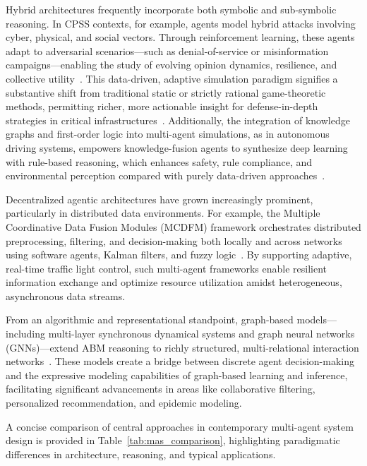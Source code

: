 \documentclass[sigconf]{acmart}
\begin{document}
Hybrid architectures frequently incorporate both symbolic and sub-symbolic reasoning. In CPSS contexts, for example, agents model hybrid attacks involving cyber, physical, and social vectors. Through reinforcement learning, these agents adapt to adversarial scenarios—such as denial-of-service or misinformation campaigns—enabling the study of evolving opinion dynamics, resilience, and collective utility~\cite{ref104}. This data-driven, adaptive simulation paradigm signifies a substantive shift from traditional static or strictly rational game-theoretic methods, permitting richer, more actionable insight for defense-in-depth strategies in critical infrastructures~\cite{ref104}. Additionally, the integration of knowledge graphs and first-order logic into multi-agent simulations, as in autonomous driving systems, empowers knowledge-fusion agents to synthesize deep learning with rule-based reasoning, which enhances safety, rule compliance, and environmental perception compared with purely data-driven approaches~\cite{ref112}.

Decentralized agentic architectures have grown increasingly prominent, particularly in distributed data environments. For example, the Multiple Coordinative Data Fusion Modules (MCDFM) framework orchestrates distributed preprocessing, filtering, and decision-making both locally and across networks using software agents, Kalman filters, and fuzzy logic~\cite{ref54}. By supporting adaptive, real-time traffic light control, such multi-agent frameworks enable resilient information exchange and optimize resource utilization amidst heterogeneous, asynchronous data streams.

From an algorithmic and representational standpoint, graph-based models—including multi-layer synchronous dynamical systems and graph neural networks (GNNs)—extend ABM reasoning to richly structured, multi-relational interaction networks~\cite{ref55,ref56,ref60}. These models create a bridge between discrete agent decision-making and the expressive modeling capabilities of graph-based learning and inference, facilitating significant advancements in areas like collaborative filtering, personalized recommendation, and epidemic modeling.

A concise comparison of central approaches in contemporary multi-agent system design is provided in Table~\ref{tab:mas_comparison}, highlighting paradigmatic differences in architecture, reasoning, and typical applications.
\end{document}

